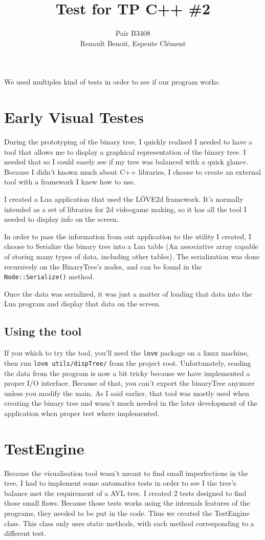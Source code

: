 \documentclass[10pt]{article}
\title{Test for TP C++ \#2}
\author{Pair B3408 \\ {\sc Renault} Benoit, {\sc Espeute} Clément}
\date{}
\begin{document}
\pagestyle{fancy}
\maketitle
We used multiples kind of tests in order to see if our program works.

\section{Early Visual Testes}
During the prototyping of the binary tree, I quickly realised I needed to have a tool that allows me to display a graphical representation of the binary tree. I needed that so I could easely see if my tree was balanced with a quick glance. Because I didn't known much about C++ libraries, I choose to create an external tool with a framework I knew how to use.

I created a Lua application that used the LÖVE2d framework. It's normally intended as a set of libraries for 2d videogame making, so it has all the tool I needed to display info on the screen.

In order to pass the information from out application to the utility I created, I choose to Serialize the binary tree into a Lua table (An associative array capable of storing many types of data, including other tables). The serialization was done recursively on the BinaryTree's nodes, and can be found in the \texttt{Node::Serialize()} method.

Once the data was serialized, it was just a matter of loading that data into the Lua program and display that data on the screen.

\subsection*{Using the tool}
If you which to try the tool, you'll need the \texttt{love} package on a linux machine, then run \texttt{love~utils/dispTree/} from the project root. Unfortunately, reading the data from the program is now a bit tricky because we have implemented a proper I/O interface. Because of that, you can't export the
binaryTree anymore unless you modify the main. As I said earlier, that tool was mostly used when creating the binary tree and wasn't much needed in the later development of the application when proper test where implemented.

\section{TestEngine}
Because the visualisation tool wasn't meant to find small imperfections in the tree, I had to implement some automatics tests in order to see I the tree's balance met the requirement of a AVL tree. I created 2 tests designed to find those small flaws. Because those tests works using the internals features of the programs, they needed to be put in the code. Thus we created the TestEngine class. This class only uses static methods, with each method corresponding to a different test.
\end{document}
